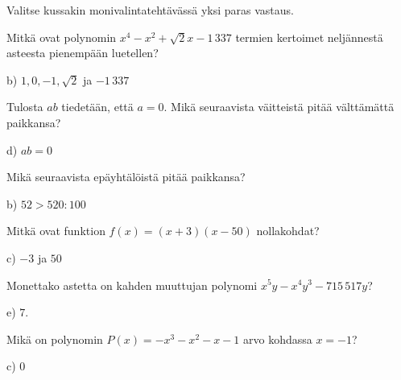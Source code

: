 \begin{multicols}{2}
Valitse kussakin monivalintatehtävässä yksi paras vastaus.

\begin{tehtava}
Mitkä ovat polynomin $x^4-x^2+\sqrt{2}x-1\,337$ termien kertoimet neljännestä asteesta pienempään luetellen?
	\begin{vastaus}
	b) $1, 0, -1, \sqrt{2}$ ja $-1\,337$
	\end{vastaus}
\end{tehtava}

\begin{tehtava}
Tulosta $ab$ tiedetään, että $a = 0$. Mikä seuraavista väitteistä pitää välttämättä paikkansa?
		\begin{vastaus}
d) $ab = 0$
	\end{vastaus}
\end{tehtava}

\begin{tehtava}
Mikä seuraavista epäyhtälöistä pitää paikkansa?
		\begin{vastaus}
b) $52 > 520:100$
	\end{vastaus}
\end{tehtava}

\begin{tehtava}
Mitkä ovat funktion $f(x)=(x+3)(x-50)$ nollakohdat?
		\begin{vastaus}
c) $-3$ ja $50$ %
	\end{vastaus}
\end{tehtava}

\begin{tehtava}
Monettako astetta on kahden muuttujan polynomi $x^5y-x^4y^3-715\,517y$?
		\begin{vastaus}
e) $7.$
	\end{vastaus}
\end{tehtava}

\begin{tehtava}
Mikä on polynomin $P(x)=-x^3-x^2-x-1$ arvo kohdassa $x=-1$?
		\begin{vastaus}
c) $0$
	\end{vastaus}
\end{tehtava}


\end{multicols}
